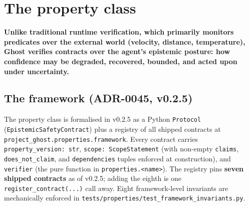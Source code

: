 \documentclass[11pt,a4paper]{article}
\begin{document}
\section{The property class}
\label{sec:properties}

\textbf{Unlike traditional runtime verification, which primarily
monitors predicates over the external world (velocity, distance,
temperature), Ghost verifies contracts over the agent's epistemic
posture: how confidence may be degraded, recovered, bounded, and
acted upon under uncertainty.}

\subsection{The framework (ADR-0045, v0.2.5)}
\label{sec:framework}

The property class is formalised in v0.2.5 as a Python
\texttt{Protocol} (\texttt{EpistemicSafetyContract}) plus a
registry of all shipped contracts at
\texttt{project\_ghost.properties.framework}. Every contract
carries \texttt{property\_version: str},
\texttt{scope: ScopeStatement} (with non-empty \texttt{claims},
\texttt{does\_not\_claim}, and \texttt{dependencies} tuples
enforced at construction), and \texttt{verifier} (the pure
function in \texttt{properties.<name>}). The registry pins
\textbf{seven shipped contracts} as of v0.2.5; adding the eighth
is one \texttt{register\_contract(...)} call away. Eight
framework-level invariants are mechanically enforced in
\texttt{tests/properties/test\_framework\_invariants.py}.
\end{document}

